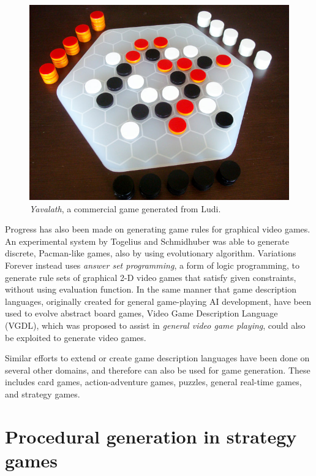 \begin{figure}
	\centering
	\includegraphics[width=.8\linewidth]{figures/yavalath.jpg}
	\caption{\textit{Yavalath}, a commercial game generated from Ludi.}
	\label{fig:yavalath}
\end{figure}

Progress has also been made on generating game rules for graphical video games. An experimental system by Togelius and Schmidhuber\cite{togelius2008experiment} was able to generate discrete, Pacman-like games, also by using evolutionary algorithm. Variations Forever\cite{smith2010variations} instead uses \textit{answer set programming}, a form of logic programming, to generate rule sets of graphical 2-D video games that satisfy given constraints, without using evaluation function. In the same manner that game description languages, originally created for general game-playing AI development, have been used to evolve abstract board games, Video Game Description Language (VGDL)\cite{ebner2013towards}, which was proposed to assist in \textit{general video game playing}, could also be exploited to generate video games.

Similar efforts to extend or create game description languages have been done on several other domains, and therefore can also be used for game generation. These includes card games\cite{font7835card}, action-adventure games\cite{dormans2012generating}, puzzles\cite{web-puzzlescript}, general real-time games\cite{kowalski15game}, and strategy games\cite{mahlmann2011towards}.
	
\section{Procedural generation in strategy games}

